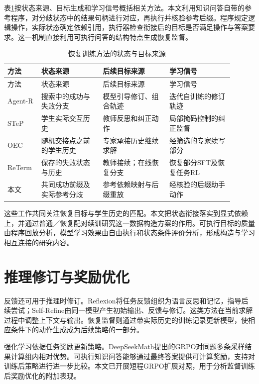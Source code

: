 表\ref{tab:nearest-recovery}按状态来源、目标生成和学习信号概括相关方法。本文利用知识问答自带的参考程序，对分歧状态中的结果句柄进行对应，再执行并核验参考后缀。程序规定逻辑操作，实际状态确定依赖引用，执行器检查衔接后的目标是否满足操作与答案要求。这一机制直接利用可执行问答的结构特点生成恢复监督。

\begin{longtable}{@{}p{0.12\linewidth}p{0.25\linewidth}p{0.27\linewidth}p{0.26\linewidth}@{}}
\caption{恢复训练方法的状态与目标来源}\label{tab:nearest-recovery}\\
\toprule
方法 & 状态来源 & 后续目标来源 & 学习信号\\
\midrule
\endfirsthead
\toprule
方法 & 状态来源 & 后续目标来源 & 学习信号\\
\midrule
\endhead
Agent-R & 搜索中的成功与失败分支 & 模型引导修订、组合轨迹 & 迭代自训练的修订轨迹\\
STeP & 学生实际交互历史 & 教师反思和纠正动作 & 局部掩码控制的纠正监督\\
OEC & 随机交接点之前的学生历史 & 专家承接历史继续求解 & 经筛选的专家续写部分\\
ReTerm & 保存的失败状态与历史 & 教师接续；在线恢复分支 & 恢复部分SFT及恢复任务RL\\
本文 & 共同成功前缀及实际参考分歧 & 参考依赖映射与后缀重放 & 经核验的后缀助手动作\\
\bottomrule
\end{longtable}

这些工作共同关注恢复目标与学生历史的匹配。本文把状态衔接落实到显式依赖上，并通过普通／恢复配对续训研究这一数据构造方案的作用。可执行目标的质量由程序回放分析，模型学习效果由自由执行和状态条件评价分析，形成构造与学习相互连接的研究内容。

\section{推理修订与奖励优化}

反馈还可用于推理时修订。Reflexion将任务反馈组织为语言反思和记忆，指导后续尝试\cite{shinn2023reflexion}；Self-Refine由同一模型产生初始输出、反馈与修订\cite{madaan2023selfrefine}。这类方法在当前求解过程中调整上下文与输出。恢复监督则通过带实际历史的训练记录更新模型，使相应条件下的动作生成成为后续策略的一部分。

强化学习依据任务奖励更新策略。DeepSeekMath提出的GRPO对同题多条采样结果计算组内相对优势\cite{shao2024deepseekmath}。可执行知识问答能够通过最终答案提供可计算奖励，支持对训练后策略进行进一步比较。本文已开展短程GRPO扩展对照，用于分析监督训练后奖励优化的附加表现。


